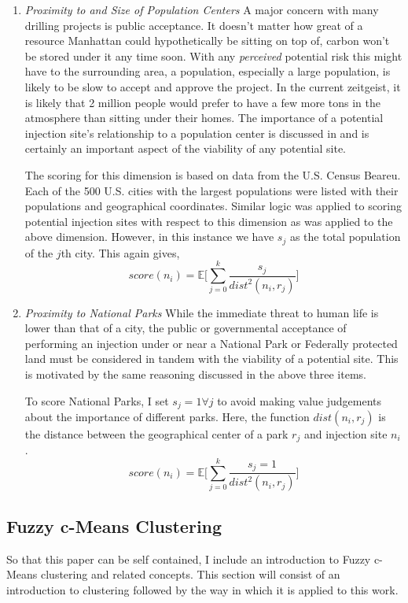 \documentclass[letterpaper, 12pt]{article}
\begin{document}
\begin{enumerate}
\item \emph{Proximity to and Size of Population Centers} A major concern with many drilling projects is public acceptance. It doesn't matter how great of a resource Manhattan could hypothetically be sitting on top of, carbon won't be stored under it any time soon. With any \emph{perceived} potential risk this might have to the surrounding area, a population, especially a large population, is likely to be slow to accept and approve the project. In the current zeitgeist, it is likely that 2 million people would prefer to have a few more tons in the atmosphere than sitting under their homes. The importance of a potential injection site's relationship to a population center is discussed in \cite{seis_induced} and is certainly an important aspect of the viability of any potential site. 

The scoring for this dimension is based on data from the U.S. Census Beareu. Each of the 500 U.S. cities with the largest populations were listed with their populations and geographical coordinates. Similar logic was applied to scoring potential injection sites with respect to this dimension as was applied to the above dimension. However, in this instance we have $s_j$ as the total population of the $j$th city. This again gives,
$$score(n_i) =  \mathbb{E}\bigg[\sum_{j=0}^k \frac{s_j}{dist^2(n_i, r_j)}\bigg]$$


\item \emph{Proximity to National Parks} While the immediate threat to human life is lower than that of a city, the public or governmental acceptance of performing an injection under or near a National Park or Federally protected land must be considered in tandem with the viability of a potential site. This is motivated by the same reasoning discussed in the above three items.

To score National Parks, I set $s_j = 1 \forall j$ to avoid making value judgements about the importance of different parks. Here, the function $dist(n_i, r_j)$ is the distance between the geographical center of a park $r_j$ and injection site $n_i$.
$$score(n_i) =  \mathbb{E}\bigg[\sum_{j=0}^k \frac{s_j = 1}{dist^2(n_i, r_j)}\bigg]$$

\end{enumerate} 

\subsection{Fuzzy c-Means Clustering}\label{fuzz}
So that this paper can be self contained, I include an introduction to Fuzzy c-Means clustering and related concepts. This section will consist of an introduction to clustering followed by the way in which it is applied to this work.
\end{document}

